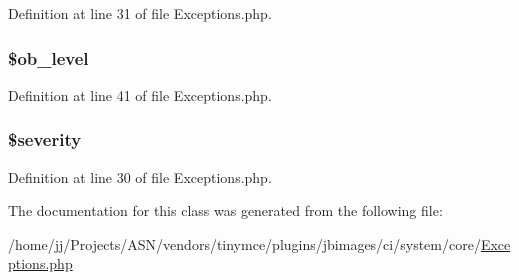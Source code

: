 Definition at line 31 of file Exceptions.\+php.

\subsubsection[{\texorpdfstring{\$ob\+\_\+level}{$ob_level}}]{\setlength{\rightskip}{0pt plus 5cm}\$ob\+\_\+level}\hypertarget{class_c_i___exceptions_abb6b6587dbaf0238bf26829c8df05d59}{}\label{class_c_i___exceptions_abb6b6587dbaf0238bf26829c8df05d59}


Definition at line 41 of file Exceptions.\+php.

\subsubsection[{\texorpdfstring{\$severity}{$severity}}]{\setlength{\rightskip}{0pt plus 5cm}\$severity}\hypertarget{class_c_i___exceptions_a85759894d444d7191251479d87eaf8c6}{}\label{class_c_i___exceptions_a85759894d444d7191251479d87eaf8c6}


Definition at line 30 of file Exceptions.\+php.



The documentation for this class was generated from the following file\+:\begin{DoxyCompactItemize}
\item 
/home/jj/\+Projects/\+A\+S\+N/vendors/tinymce/plugins/jbimages/ci/system/core/\hyperlink{_exceptions_8php}{Exceptions.\+php}\end{DoxyCompactItemize}
